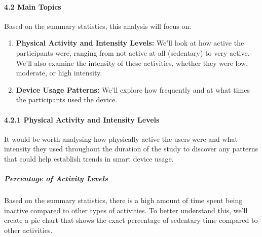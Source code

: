 \documentclass[
]{article}
\begin{document}
\hypertarget{main-topics}{%
\paragraph{4.2 Main Topics}\label{main-topics}}

Based on the summary statistics, this analysis will focus on:

\begin{enumerate}
\def\labelenumi{\arabic{enumi}.}
\item
  \textbf{Physical Activity and Intensity Levels:} We'll look at how
  active the participants were, ranging from not active at all
  (sedentary) to very active. We'll also examine the intensity of these
  activities, whether they were low, moderate, or high intensity.
\item
  \textbf{Device Usage Patterns:} We'll explore how frequently and at
  what times the participants used the device.
\end{enumerate}

\hypertarget{physical-activity-and-intensity-levels}{%
\paragraph{4.2.1 Physical Activity and Intensity
Levels}\label{physical-activity-and-intensity-levels}}

It would be worth analysing how physically active the users were and
what intensity they used throughout the duration of the study to
discover any patterns that could help establish trends in smart device
usage.

\hypertarget{percentage-of-activity-levels}{%
\subparagraph{Percentage of Activity
Levels}\label{percentage-of-activity-levels}}

Based on the summary statistics, there is a high amount of time spent
being inactive compared to other types of activities. To better
understand this, we'll create a pie chart that shows the exact
percentage of sedentary time compared to other activities.
\end{document}

